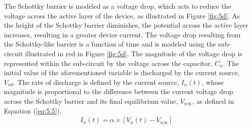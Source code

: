 

\noindent The Schottky barrier is modeled as a voltage drop, which acts to reduce the voltage across the active layer of the device, as illustrated in Figure \ref{fig:5d}. As the height of the Schottky barrier diminishes, the potential across the active layer increases, resulting in a greater device current. The voltage drop resulting from the Schottky-like barrier is a function of time and is modeled using the sub-circuit illustrated in red in Figure \ref{fig:5d}. The magnitude of the voltage drop is represented within the sub-circuit by the voltage across the capacitor, $C_n$. The initial value of the aforementioned variable is discharged by the current source, $V_{n0}$. The rate of discharge is defined by the current source, $I_n(t)$, whose magnitude is proportional to the difference between the current voltage drop across the Schottky barrier and its final equilibrium value, $V_{n\infty}$, as defined in Equation (\ref{eq:5.5}).
\begin{align}
I_n(t) = \alpha \times \left[ V_n(t) - V_{n\infty} \right] \label{eq:5.5} 
\end{align}


